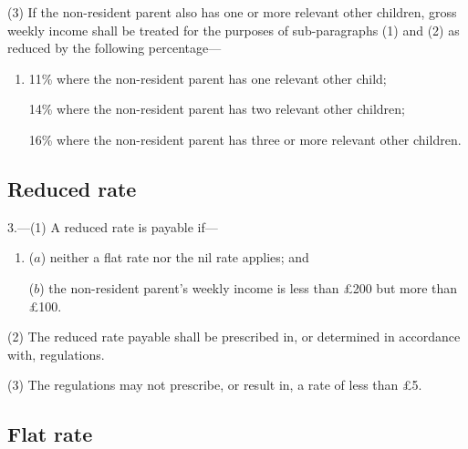 \documentclass[12pt,a4paper]{article}
\begin{document}
{{(3) If the non-resident parent also has one or more relevant other children, gross weekly income shall be treated for the purposes of sub-paragraphs (1) and (2) as reduced by the following percentage—
\begin{enumerate}\item[]
11\% where the non-resident parent has one relevant other child;

14\% where the non-resident parent has two relevant other children;

16\% where the non-resident parent has three or more relevant other children.
\end{enumerate}


}

\subsection*{Reduced rate}

3.---(1) A reduced rate is payable if---
\begin{enumerate}\item[]
($a$) neither a flat rate nor the nil rate applies; and

($b$) the non-resident parent’s  weekly income is less than £200 but more than £100.
\end{enumerate}

(2) The reduced rate payable shall be prescribed in, or determined in accordance with, regulations.

(3) The regulations may not prescribe, or result in, a rate of less than £5.


\subsection*{Flat rate}

}
\end{document}
